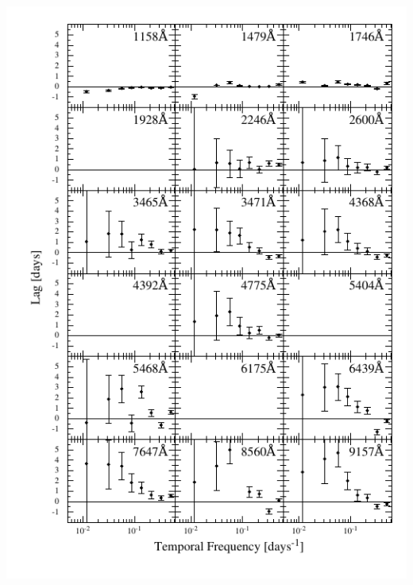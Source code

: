 \documentclass[11pt,letterpaper]{article}
\begin{document}
\includegraphics{../img/timelag_atlas_err2.pdf}
\end{document}
